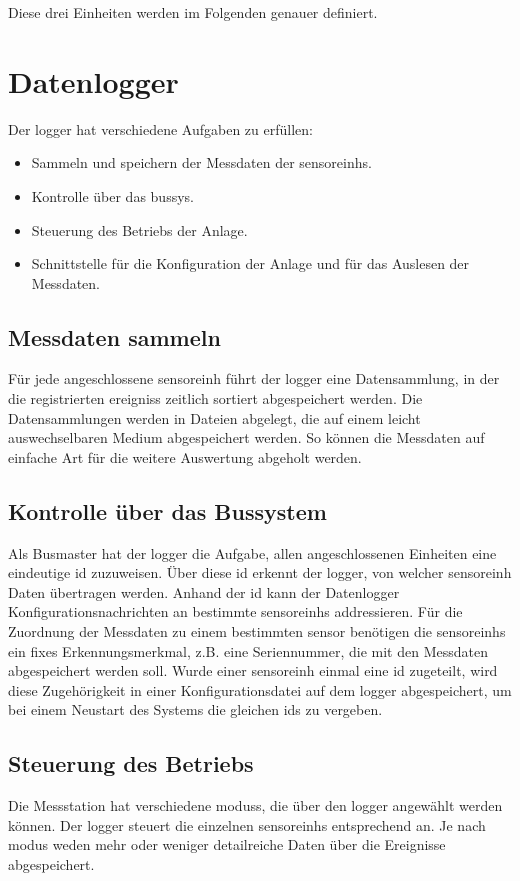 Diese drei Einheiten werden im Folgenden genauer definiert.

\section{Datenlogger}
Der \gls{logger} hat verschiedene Aufgaben zu erfüllen:
\begin{itemize}
\item Sammeln und speichern der Messdaten der \glspl{sensoreinh}.
\item Kontrolle über das \gls{bussys}.
\item Steuerung des Betriebs der Anlage.
\item Schnittstelle für die Konfiguration der Anlage und für das Auslesen der Messdaten.
\end{itemize}


\subsection{Messdaten sammeln}
Für jede angeschlossene \gls{sensoreinh} führt der \gls{logger} eine Datensammlung, in der die registrierten \glspl{ereignis} zeitlich sortiert abgespeichert werden. Die Datensammlungen werden in Dateien abgelegt, die auf einem leicht auswechselbaren Medium abgespeichert werden. So können die Messdaten auf einfache Art für die weitere Auswertung abgeholt werden.


\subsection{Kontrolle über das Bussystem}
Als Busmaster hat der \gls{logger} die Aufgabe, allen angeschlossenen Einheiten eine eindeutige \gls{id} zuzuweisen. Über diese \gls{id} erkennt der \gls{logger}, von welcher \gls{sensoreinh} Daten übertragen werden. Anhand der \gls{id} kann der Datenlogger Konfigurationsnachrichten an bestimmte \glspl{sensoreinh} addressieren. Für die Zuordnung der Messdaten zu einem bestimmten \gls{sensor} benötigen die \glspl{sensoreinh} ein fixes Erkennungsmerkmal, z.B. eine Seriennummer, die mit den Messdaten abgespeichert werden soll. Wurde einer \gls{sensoreinh} einmal eine \gls{id} zugeteilt, wird diese Zugehörigkeit in einer Konfigurationsdatei auf dem \gls{logger} abgespeichert, um bei einem Neustart des Systems die gleichen \gls{id}s zu vergeben.


\subsection{Steuerung des Betriebs}
Die Messstation hat verschiedene \glspl{modus}, die über den \gls{logger} angewählt werden können. Der \gls{logger} steuert die einzelnen \glspl{sensoreinh} entsprechend an. Je nach \gls{modus} weden mehr oder weniger detailreiche Daten über die Ereignisse abgespeichert.


